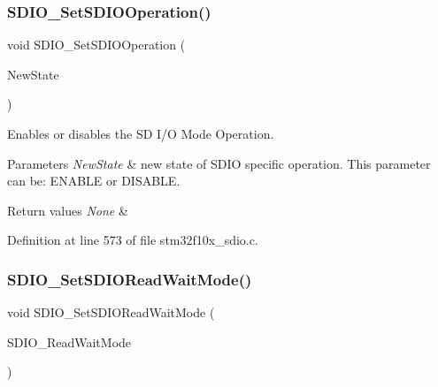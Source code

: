 \subsubsection{\texorpdfstring{S\+D\+I\+O\+\_\+\+Set\+S\+D\+I\+O\+Operation()}{SDIO\_SetSDIOOperation()}}
{\footnotesize\ttfamily void S\+D\+I\+O\+\_\+\+Set\+S\+D\+I\+O\+Operation (\begin{DoxyParamCaption}\item[{\hyperlink{group___exported__types_gac9a7e9a35d2513ec15c3b537aaa4fba1}{Functional\+State}}]{New\+State }\end{DoxyParamCaption})}



Enables or disables the SD I/O Mode Operation. 


\begin{DoxyParams}{Parameters}
{\em New\+State} & new state of S\+D\+IO specific operation. This parameter can be\+: E\+N\+A\+B\+LE or D\+I\+S\+A\+B\+LE. \\
\hline
\end{DoxyParams}

\begin{DoxyRetVals}{Return values}
{\em None} & \\
\hline
\end{DoxyRetVals}


Definition at line 573 of file stm32f10x\+\_\+sdio.\+c.

\mbox{\label{group___s_d_i_o___private___functions_ga2baac4ea1bb6c2d94345d2712604338a}} 
\subsubsection{\texorpdfstring{S\+D\+I\+O\+\_\+\+Set\+S\+D\+I\+O\+Read\+Wait\+Mode()}{SDIO\_SetSDIOReadWaitMode()}}
{\footnotesize\ttfamily void S\+D\+I\+O\+\_\+\+Set\+S\+D\+I\+O\+Read\+Wait\+Mode (\begin{DoxyParamCaption}\item[{uint32\+\_\+t}]{S\+D\+I\+O\+\_\+\+Read\+Wait\+Mode }\end{DoxyParamCaption})}



